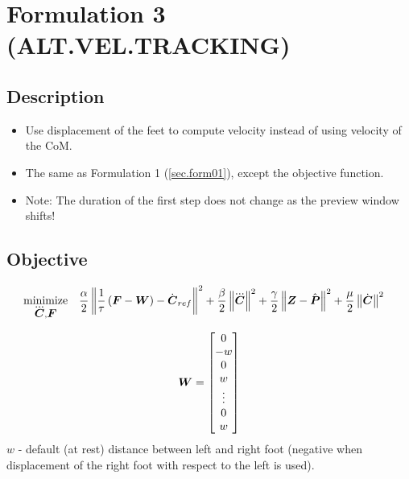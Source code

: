 \section{Formulation 3 (ALT.VEL.TRACKING)}\label{sec.form03}


\subsection{Description}
\begin{itemize}
    \item Use displacement of the feet to compute velocity instead of using velocity of the CoM.
    \item The same as Formulation 1 (\ref{sec.form01}), except the objective function.
    \item Note: The duration of the first step does not change as the preview window shifts!
\end{itemize}



\subsection{Objective}
\begin{equation*}
\begin{split}
    \minimize{\cJerk, \FD}  & \frac{\alpha}{2} \norm{\frac{1}{\tau}\left(\FD - \V{W}\right) - \cVel_{ref}}^2 + 
                              \frac{\beta}{2} \norm{\cJerk}^2 +
                              \frac{\gamma}{2} \norm{\ZMP - \FPh}^2 +
                              \frac{\mu}{2} \norm{\cVel}^2
\end{split}
\end{equation*}

\begin{equation*}
\mbox{\boldmath $W$} = 
\begin{bmatrix}
    0 \\
    -w \\
    0 \\
    w \\
    \vdots \\
    0 \\
    w \\
\end{bmatrix}
\end{equation*}
$w$ - default (at rest) distance between left and right foot (negative when displacement of the right foot
with respect to the left is used).

